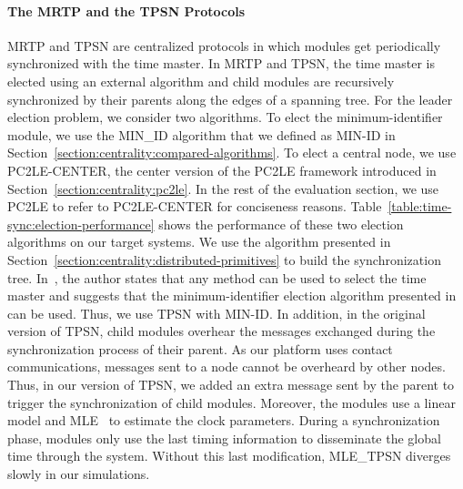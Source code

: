 \paragraph{The MRTP and the TPSN Protocols}
MRTP and TPSN are centralized protocols in which modules get periodically synchronized with the time master. In MRTP and TPSN, the time master is elected using an external algorithm and child modules are recursively synchronized by their parents along the edges of a spanning tree. For the leader election problem, we consider two algorithms. To elect the minimum-identifier module, we use the MIN\_ID algorithm that we defined as MIN-ID in Section~\ref{section:centrality:compared-algorithms}. To elect a central node, we use PC2LE-CENTER, the center version of the PC2LE framework introduced in Section~\ref{section:centrality:pc2le}. In the rest of the evaluation section, we use PC2LE to refer to PC2LE-CENTER for conciseness reasons. Table~\ref{table:time-sync:election-performance} shows the performance of these two election algorithms on our target systems. We use the \cheungCb{} algorithm presented in Section~\ref{section:centrality:distributed-primitives} to build the synchronization tree. In~\cite{ganeriwal2003timing}, the author states that any method can be used to select the time master and suggests that the minimum-identifier election algorithm presented in~\cite{malpani2000leader} can be used. Thus, we use TPSN with MIN-ID. In addition, in the original version of TPSN, child modules overhear the messages exchanged during the synchronization process of their parent. As our platform uses contact communications, messages sent to a node cannot be overheard by other nodes. Thus, in our version of TPSN, we added an extra message sent by the parent to trigger the synchronization of child modules. Moreover, the modules use a linear model and MLE~\cite{leng2010clock} to estimate the clock parameters. During a synchronization phase, modules only use the last timing information to disseminate the global time through the system. Without this last modification, MLE\_TPSN diverges slowly in our simulations.

